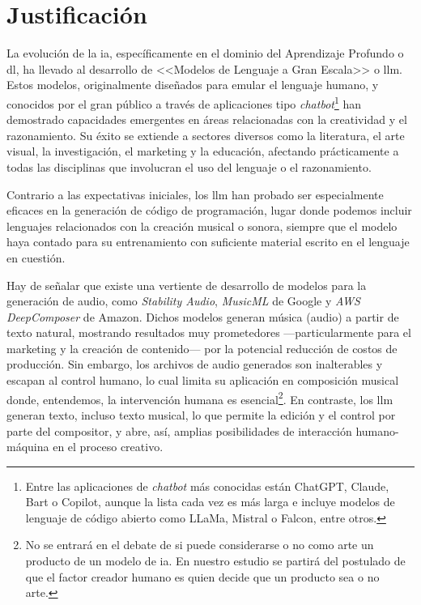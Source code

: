 \section{Justificación}



La evolución de la \gls{ia}, específicamente en el dominio del Aprendizaje Profundo o \gls{dl}, ha llevado al desarrollo de <<Modelos de Lenguaje a Gran Escala>> o \gls{llm}. Estos modelos, originalmente diseñados para emular el lenguaje humano, y conocidos por el gran público a través de aplicaciones tipo \emph{chatbot}\footnote{Entre las aplicaciones de \emph{chatbot} más conocidas están ChatGPT, Claude, Bart o Copilot, aunque la lista cada vez es más larga e incluye modelos de lenguaje de código abierto como LLaMa, Mistral o Falcon, entre otros.} han demostrado capacidades emergentes en áreas relacionadas con la creatividad y el razonamiento. Su éxito se extiende a sectores diversos como la literatura, el arte visual, la investigación, el marketing y la educación, afectando prácticamente a todas las disciplinas que involucran el uso del lenguaje o el razonamiento.

Contrario a las expectativas iniciales, los \gls{llm} han probado ser especialmente eficaces en la generación de código de programación, lugar donde podemos incluir lenguajes relacionados con la creación musical o sonora, siempre que el modelo haya contado para su entrenamiento con suficiente material escrito en el lenguaje en cuestión.


Hay de señalar que existe una vertiente de desarrollo de modelos para la generación de audio, como \emph{Stability Audio}, \emph{MusicML} de Google y \emph{AWS DeepComposer} de Amazon. Dichos modelos generan música (audio) a partir de texto natural, mostrando resultados muy prometedores ---particularmente para el marketing y la creación de contenido--- por la potencial reducción de costos de producción. Sin embargo, los archivos de audio generados son inalterables y escapan al control humano, lo cual limita su aplicación en composición musical donde, entendemos, la intervención humana es esencial\footnote{No se entrará en el debate de si puede considerarse o no como arte un producto de un modelo de \gls{ia}. En nuestro estudio se partirá del postulado de que el factor creador humano es quien decide que un producto sea o no arte.}. En contraste, los \gls{llm} generan texto, incluso texto musical, lo que permite la edición y el control por parte del compositor, y abre, así, amplias posibilidades de interacción humano-máquina en el proceso creativo.

